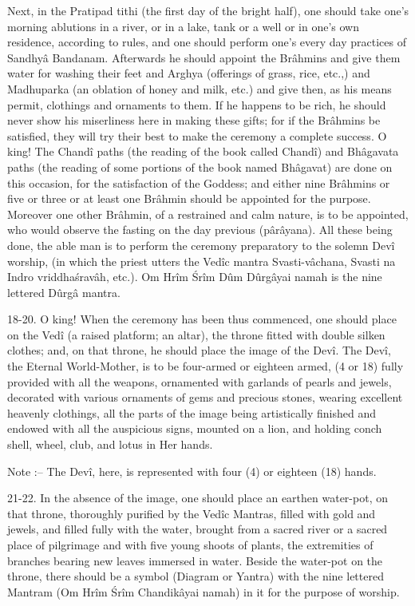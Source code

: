 Next, in the Pratipad tithi (the first day of the bright half), one should take one's morning ablutions in a river, or in a lake, tank or a well or in one's own residence, according to rules, and one should perform one's every day practices of Sandhy\^a Bandanam. Afterwards he should appoint the Br\^ahmins and give them water for washing their feet and Arghya (offerings of grass, rice, etc.,) and Madhuparka (an oblation of honey and milk, etc.) and give then, as his means permit, clothings and ornaments to them. If he happens to be rich, he should never show his miserliness here in making these gifts; for if the Br\^ahmins be satisfied, they will try their best to make the ceremony a complete success. O king! The Chand\^i paths (the reading of the book called Chand\^i) and Bh\^agavata paths (the reading of some portions of the book named Bh\^agavat) are done on this occasion, for the satisfaction of the Goddess; and either nine Br\^ahmins or five or three or at least one Br\^ahmin should be appointed for the purpose. Moreover one other Br\^ahmin, of a restrained and calm nature, is to be appointed, who would observe the fasting on the day previous (p\^ar\^ayana). All these being done, the able man is to perform the ceremony preparatory to the solemn Dev\^i worship, (in which the priest utters the Ved\^ic mantra Svasti-v\^achana, Svasti na Indro vriddha\'srav\^ah, etc.). Om Hr\^im \'Sr\^im Dûm Dûrg\^ayai namah is the nine lettered Dûrg\^a mantra.

18-20. O king! When the ceremony has been thus commenced, one should place on the Ved\^i (a raised platform; an altar), the throne fitted with double silken clothes; and, on that throne, he should place the image of the Dev\^i. The Dev\^i, the Eternal World-Mother, is to be four-armed or eighteen armed, (4 or 18) fully provided with all the weapons, ornamented with garlands of pearls and jewels, decorated with various ornaments of gems and precious stones, wearing excellent heavenly clothings, all the parts of the image being artistically finished and endowed with all the auspicious signs, mounted on a lion, and holding conch shell, wheel, club, and lotus in Her hands.

Note :-- The Dev\^i, here, is represented with four (4) or eighteen (18) hands.

21-22. In the absence of the image, one should place an earthen water-pot, on that throne, thoroughly purified by the Ved\^ic Mantras, filled with gold and jewels, and filled fully with the water, brought from a sacred river or a sacred place of pilgrimage and with five young shoots of plants, the extremities of branches bearing new leaves immersed in water. Beside the water-pot on the throne, there should be a symbol (Diagram or Yantra) with the nine lettered Mantram (Om Hr\^im \'Sr\^im Chandik\^ayai namah) in it for the purpose of worship.

